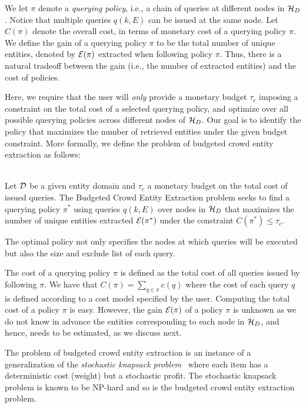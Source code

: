 We let $\pi$ denote a {\em querying policy}, i.e., a chain of queries at different nodes in $\mathcal{H}_D$. Notice that multiple queries $q(k,E)$ can be issued at the same node. Let $C(\pi)$ denote the overall cost, in terms of monetary cost of a querying policy $\pi$. We define the gain of a querying policy $\pi$ to be the total number of unique entities, denoted by $\mathcal{E}(\pi)$ extracted when following policy $\pi$. Thus, there is a natural tradeoff between the gain (i.e., the number of extracted entities) and the cost of policies. 

Here, we require that the user will {\em only} provide a monetary budget $\tau_c$ imposing a constraint on the total cost of a selected querying policy, and optimize over all possible querying policies across different nodes of $\mathcal{H}_D$. Our goal is to identify the policy that maximizes the number of retrieved entities under the given budget constraint. More formally, we define the problem of budgeted crowd entity extraction as follows:

\begin{problem} \ \\
Let $\mathcal{D}$ be a given entity domain and $\tau_c$ a monetary budget on the total cost of issued queries. The Budgeted Crowd Entity Extraction problem seeks to find a querying policy $\pi^*$ using queries $q(k,E)$ over nodes in $\mathcal{H}_D$ that maximizes the number of unique entities extracted $\mathcal{E}(\pi^*)$ under the constraint $C(\pi^*) \leq \tau_c$.
\end{problem}
The optimal policy not only specifies the nodes at which queries will be executed but also the size and exclude list of each query.

The cost of a querying policy $\pi$ is defined as the total cost of all queries issued by following $\pi$. We have that $C(\pi) = \sum_{q \in \pi} c(q)$ where the cost of each query $q$ is defined according to a cost model specified by the user. Computing the total cost of a policy $\pi$ is easy. However, the gain $\mathcal{E}(\pi)$ of a policy $\pi$ is unknown as we do not know in advance the entities corresponding to each node in $\mathcal{H}_D$, and hence, needs to be estimated, as we discuss next. 

The problem of budgeted crowd entity extraction is an instance of a generalization of the {\em stochastic knapsack problem}~\cite{kosuch,steinberg} where each item has a deterministic cost (weight) but a stochastic profit. The stochastic knapsack problem is known to be NP-hard and so is the budgeted crowd entity extraction problem.

